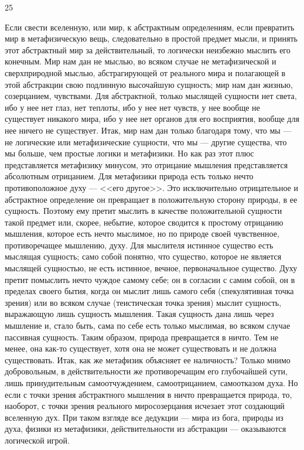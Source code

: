 \documentclass[12pt]{article}
\begin{document}
25

Если свести вселенную, или мир, к абстрактным определениям, если превратить мир в метафизическую вещь, следовательно в простой предмет мысли, и принять этот абстрактный мир за действительный, то логически неизбежно мыслить его конечным. Мир нам дан не мыслью, во всяком случае не метафизической и сверхприродной мыслью, абстрагирующей от реального мира и полагающей в этой абстракции свою подлинную высочайшую сущность; мир нам дан жизнью, созерцанием, чувствами. Для абстрактной, только мыслящей сущности нет света, ибо у нее нет глаз, нет теплоты, ибо у нее нет чувств, у нее вообще не существует никакого мира, ибо у нее нет органов для его восприятия, вообще для нее ничего не существует. Итак, мир нам дан только благодаря тому, что мы --- не логические или метафизические сущности, что мы --- другие существа, что мы больше, чем простые логики и метафизики. Но как раз этот плюс представляется метафизику минусом, это отрицание мышления представляется абсолютным отрицанием. Для метафизики природа есть только нечто противоположное духу --- <<его другое>>. Это исключительно отрицательное и абстрактное определение он превращает в положительную сторону природы, в ее сущность. Поэтому ему претит мыслить в качестве положительной сущности такой предмет или, скорее, небытие, которое сводится к простому отрицанию мышления, которое есть нечто мыслимое, но по природе своей чувственное, противоречащее мышлению, духу. Для мыслителя истинное существо есть мыслящая сущность; само собой понятно, что существо, которое не является мыслящей сущностью, не есть истинное, вечное, первоначальное существо. Духу претит помыслить нечто чуждое самому себе; он в согласии с самим собой, он в пределах своего бытия, когда он мыслит лишь самого себя (спекулятивная точка зрения) или во всяком случае (теистическая точка зрения) мыслит сущность, выражающую лишь сущность мышления. Такая сущность дана лишь через мышление и, стало быть, сама по себе есть только мыслимая, во всяком случае пассивная сущность. Таким образом, природа превращается в ничто. Тем не менее, она как-то существует, хотя она не может существовать и не должна существовать. Итак, как же метафизик объясняет ее наличность? Только мнимо добровольным, в действительности же противоречащим его глубочайшей сути, лишь принудительным самоотчуждением, самоотрицанием, самоотказом духа. Но если с точки зрения абстрактного мышления в ничто превращается природа, то, наоборот, с точки зрения реального миросозерцания исчезает этот создающий вселенную дух. При таком взгляде все дедукции --- мира из бога, природы из духа, физики из метафизики, действительности из абстракции --- оказываются логической игрой.
\end{document}

